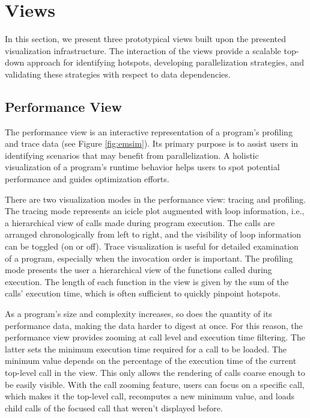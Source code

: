 \section{Views}
In this section, we present three prototypical views built upon the
presented visualization infrastructure. The interaction of the views provide a
scalable top-down approach for identifying hotspots, developing parallelization
strategies, and validating these strategies with respect to data dependencies.

\subsection{Performance View}
\label{sec:performance_view}
The performance view is an interactive representation of a program's profiling
and trace data (see Figure \ref{fig:emsim}). Its primary purpose is to assist
users in identifying scenarios that may benefit from parallelization. A
holistic visualization of a program's runtime behavior helps users to spot
potential performance and guides optimization efforts.

There are two visualization modes in the performance view: tracing and
profiling. The tracing mode represents an icicle plot augmented with loop
information, i.e., a hierarchical view of calls made during program execution.
The calls are arranged chronologically from left to right, and the visibility
of loop information can be toggled (on or off). Trace visualization is useful
for detailed examination of a program, especially when the invocation order is
important. The profiling mode presents the user a hierarchical view of the
functions called during execution. The length of each function in the view is
given by the sum of the calls' execution time, which is often sufficient to
quickly pinpoint hotspots.

As a program's size and complexity increases, so does the quantity of its
performance data, making the data harder to digest at once. For this reason,
the performance view provides zooming at call level and execution time
filtering. The latter sets the minimum execution time required for a call to be
loaded. The minimum value depends on the percentage of the execution time of
the current top-level call in the view. This only allows the rendering of calls
coarse enough to be easily visible. With the call zooming feature, users can
focus on a specific call, which makes it the top-level call, recomputes a new
minimum value, and loads child calls of the focused call that weren't displayed
before.

